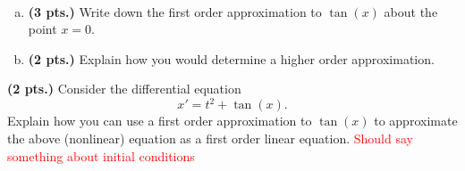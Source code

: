 \documentclass[12pt]{amsbook}
\begin{document}
\begin{problem}~
\begin{enumerate}[(a)]
    \item \textbf{(3 pts.)} Write down the first order approximation to $\tan(x)$ about the point $x=0$.
    \item \textbf{(2 pts.)} Explain how you would determine a higher order approximation.
\end{enumerate}
\end{problem}

\newpage

\begin{problem}
\textbf{(2 pts.)} Consider the differential equation
\[
x' = t^2 + \tan(x).
\]
Explain how you can use a first order approximation to $\tan(x)$ to approximate the above (nonlinear) equation as a first order linear equation. \textcolor{red}{Should say something about initial conditions}
\end{problem}
\end{document}
